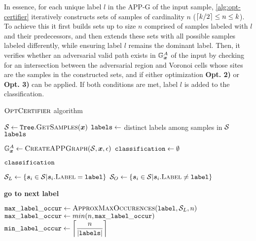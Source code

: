 In essence, for each unique label $l$ in the \acs{APP-G} of the input sample, \autoref{alg:opt-certifier} iteratively constructs sets of samples of cardinality $n$ ($\ceil*{k/2} \leq n \leq k$). To achieve this it first builds sets up to size $n$ comprised of samples labeled with $l$ and their predecessors, and then extends these sets with all possible samples labeled differently, while ensuring label $l$ remains the dominant label. Then, it verifies whether an adversarial valid path exists in $\APPG$ of the input by checking for an intersection between the adversarial region and Voronoi cells whose sites are the samples in the constructed sets, and if either optimization \textbf{Opt. 2)} or \textbf{Opt. 3)} can be applied. If both conditions are met, label $l$ is added to the classification.

\begin{algorithm}
	\caption[$\algtitle{OptCertifier}$ algorithm]{$\algtitle{OptCertifier}$ algorithm}
	\label{alg:opt-certifier}
	\begin{algorithmic}[1]

    \State $\set \gets \var{Tree}.\textsc{GetSamples}(\vinput)$
    \State $\var{labels} \gets$ distinct labels among samples in $\set$
      \State \Return $\var{labels}$
    \EndIf

    \State $\APPG \gets \algtitle{CreateAPPGraph}(\set, \vinput, \epsilon)$
    \State $\var{classification} \gets \emptyset$



        \State \Return $\var{classification}$
      \EndIf

      \State $\set_L \gets \{\sample \in \set | \sample.\textsc{Label} = \var{label}\}$
      \State $\set_O \gets \{\sample \in \set | \sample.\textsc{Label} \neq \var{label}\}$

        \State \textbf{go to next label}
      \EndIf


        \State $\var{max\_label\_occur} \gets \algtitle{ApproxMaxOccurences}(\var{label}, \set_L, n)$
        \State $\var{max\_label\_occur} \gets min(n, \var{max\_label\_occur})$
        \State $\var{min\_label\_occur} \gets \ceil*{\dfrac{n}{|\var{labels}|}}$


\end{algorithmic}
\end{algorithm}
